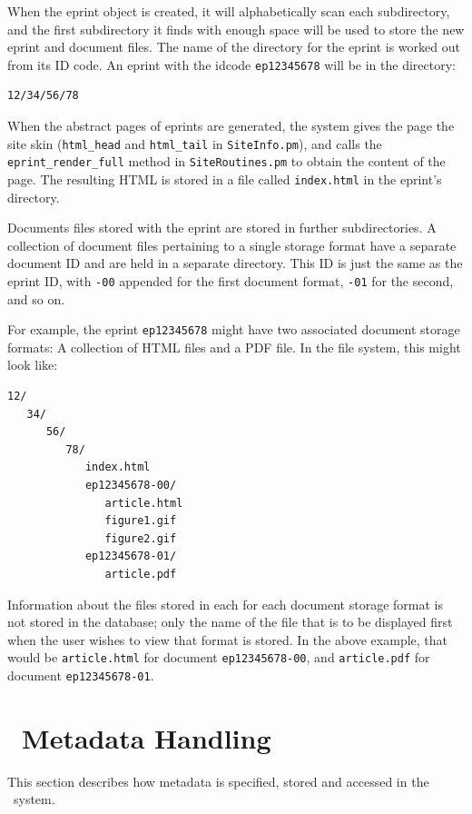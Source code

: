 When the eprint object is created, it will alphabetically scan each subdirectory, and the first subdirectory it finds with enough space will be used to store the new eprint and document files. The name of the directory for the eprint is worked out from its ID code. An eprint with the idcode {\tt ep12345678} will be in the directory:

\begin{verbatim}
12/34/56/78
\end{verbatim}

When the abstract pages of eprints are generated, the system gives the page the site skin ({\tt html\_head} and {\tt html\_tail} in {\tt SiteInfo.pm}), and calls the {\tt eprint\_render\_full} method in {\tt SiteRoutines.pm} to obtain the content of the page. The resulting HTML is stored in a file called {\tt index.html} in the eprint's directory.

Documents files stored with the eprint are stored in further subdirectories. A collection of document files pertaining to a single storage format have a separate document ID and are held in a separate directory. This ID is just the same as the eprint ID, with {\tt -00} appended for the first document format, {\tt -01} for the second, and so on.

For example, the eprint {\tt ep12345678} might have two associated document storage formats: A collection of HTML files and a PDF file. In the file system, this might look like:

\begin{verbatim}
12/
   34/
      56/
         78/
            index.html
            ep12345678-00/
               article.html
               figure1.gif
               figure2.gif
            ep12345678-01/
               article.pdf
\end{verbatim}

Information about the files stored in each for each document storage format is not stored in the database; only the name of the file that is to be displayed first when the user wishes to view that format is stored. In the above example, that would be {\tt article.html} for document {\tt ep12345678-00}, and {\tt article.pdf} for document {\tt ep12345678-01}.


\section{\eprints\ Metadata Handling}

This section describes how metadata is specified, stored and accessed in the \eprints\ system.

